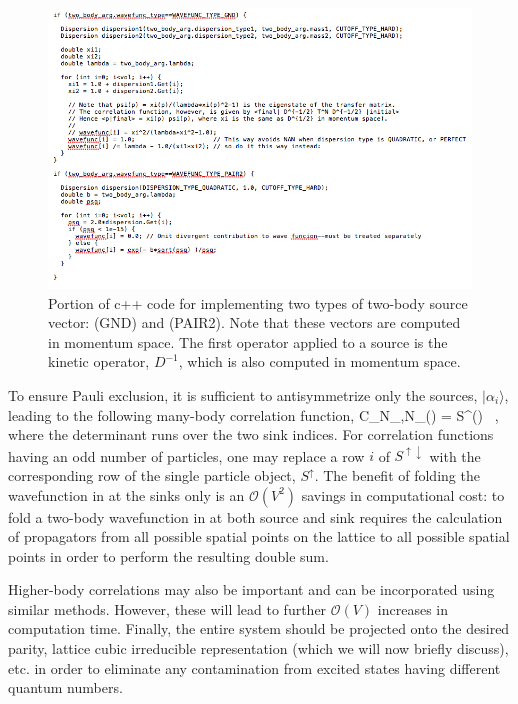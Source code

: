 \begin{figure}
\begin{center}
\includegraphics[width=\linewidth]{Chapter5-figures/twobody}
\end{center}
\caption{\label{fig:wfcode}Portion of c++ code for implementing two types of two-body source vector:  (GND) and  (PAIR2). Note that these vectors are computed in momentum space. The first operator applied to a source is the kinetic operator, $D^{-1}$, which is also computed in momentum space.}
\end{figure}

To ensure Pauli exclusion, it is sufficient to antisymmetrize only the sources, $|\alpha_i \rangle$, leading to the following many-body correlation function,
\beq
C_{N_{\uparrow},N_{\downarrow}}(\tau) = \langle \det S^{\uparrow \downarrow}(\tau) \rangle \ ,
\eeq 
where the determinant runs over the two sink indices. For correlation functions having an odd number of particles, one may replace a row $i$ of $S^{\uparrow\downarrow}$ with the corresponding row of the single particle object, $S^{\uparrow}$. The benefit of folding the wavefunction in at the sinks only is an ${\mathcal{ O}}(V^2)$ savings in computational cost: to fold a two-body wavefunction in at both source and sink requires the calculation of propagators from all possible spatial points on the lattice to all possible spatial points in order to perform the resulting double sum. 

Higher-body correlations may also be important and can be incorporated using similar methods. However, these will lead to further ${\mathcal{ O}}(V)$ increases in computation time. Finally, the entire system should be projected onto the desired parity, lattice cubic irreducible representation (which we will now briefly discuss), etc. in order to eliminate any contamination from excited states having different quantum numbers. 

